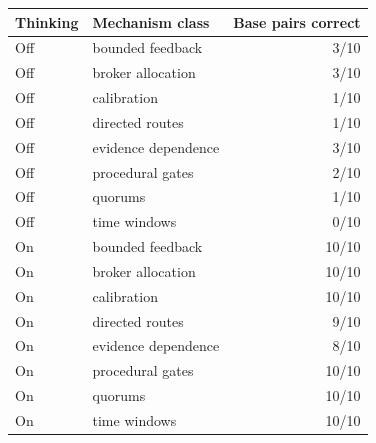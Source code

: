\begin{tabular}{llr}
\toprule
Thinking & Mechanism class & Base pairs correct \\
\midrule
Off & bounded feedback & 3/10 \\
Off & broker allocation & 3/10 \\
Off & calibration & 1/10 \\
Off & directed routes & 1/10 \\
Off & evidence dependence & 3/10 \\
Off & procedural gates & 2/10 \\
Off & quorums & 1/10 \\
Off & time windows & 0/10 \\
On & bounded feedback & 10/10 \\
On & broker allocation & 10/10 \\
On & calibration & 10/10 \\
On & directed routes & 9/10 \\
On & evidence dependence & 8/10 \\
On & procedural gates & 10/10 \\
On & quorums & 10/10 \\
On & time windows & 10/10 \\
\bottomrule
\end{tabular}
